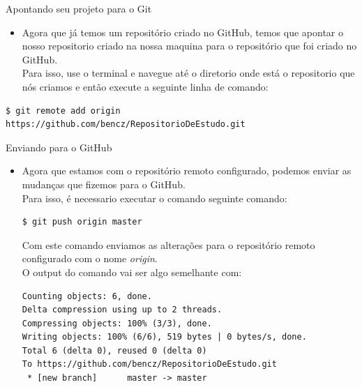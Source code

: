 \begin{slide}[method=direct]{Apontando seu projeto para o Git}
	\begin{itemize}
	\item{Agora que já temos um repositório criado no GitHub, temos que apontar o nosso repositorio criado na nossa maquina para o repositório que foi criado no GitHub. \\
	Para isso, use o terminal e navegue até o diretorio onde está o repositorio que nós criamos e então execute a seguinte linha de comando:	}
	\end{itemize}
	
	\begin{lstlisting}[style=Bash,basicstyle=\tiny]
$ git remote add origin https://github.com/bencz/RepositorioDeEstudo.git
          \end{lstlisting}
\end{slide}

\begin{slide}[method=direct]{Enviando para o GitHub}
	\begin{itemize}
	\item{Agora que estamos com o repositório remoto configurado, podemos enviar as mudanças que fizemos para o GitHub.\\
	         Para isso, é necessario executar o comando seguinte comando:
	         \begin{lstlisting}[style=Bash]
$ git push origin master
	         \end{lstlisting}
	         Com este comando enviamos as alterações para o repositório remoto configurado com o nome \textit{origin}. \\
	         O output do comando vai ser algo semelhante com:
	         \begin{lstlisting}[style=Bash,basicstyle=\tiny]
Counting objects: 6, done.
Delta compression using up to 2 threads.
Compressing objects: 100% (3/3), done.
Writing objects: 100% (6/6), 519 bytes | 0 bytes/s, done.
Total 6 (delta 0), reused 0 (delta 0)
To https://github.com/bencz/RepositorioDeEstudo.git
 * [new branch]      master -> master
	         \end{lstlisting}
	         }
	\end{itemize}
\end{slide}

